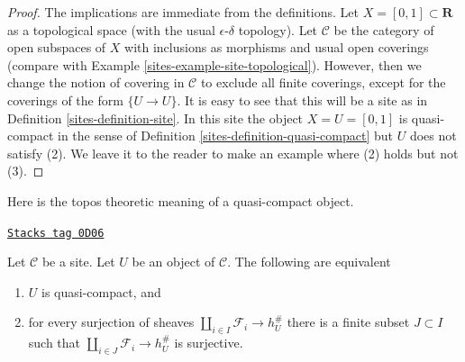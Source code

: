 \begin{proof}

The implications are immediate from the definitions.
Let $X = [0, 1] \subset \mathbf{R}$
as a topological space (with the usual $\epsilon$-$\delta$ topology).
Let $\mathcal{C}$ be the category of open subspaces of $X$ with
inclusions as morphisms and usual open coverings (compare with
Example \ref{sites-example-site-topological}). However, then we change the notion
of covering in $\mathcal{C}$ to exclude all finite coverings, except
for the coverings of the form $\{U \to U\}$. It is easy to see that this
will be a site as in Definition \ref{sites-definition-site}.
In this site the object $X = U = [0, 1]$ is quasi-compact in the sense of
Definition \ref{sites-definition-quasi-compact} but $U$ does not satisfy (2).
We leave it to the reader to make an example where (2) holds but not (3).
\end{proof}

Here is the topos theoretic meaning of a quasi-compact object.

\begin{lemma}
\label{sites-lemma-quasi-compact}
\href{https://stacks.math.columbia.edu/tag/0D06}{\texttt{Stacks tag 0D06}}

Let $\mathcal{C}$ be a site. Let $U$ be an object of $\mathcal{C}$.
The following are equivalent
\begin{enumerate}
\item $U$ is quasi-compact, and
\item for every surjection of sheaves
$\coprod_{i \in I} \mathcal{F}_i \to h_U^\#$
there is a finite subset $J \subset I$ such that
$\coprod_{i \in J} \mathcal{F}_i \to h_U^\#$ is surjective.
\end{enumerate}
\end{lemma}

